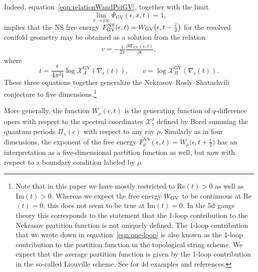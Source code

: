 \documentclass[pdftex]{sigma}
\numberwithin{equation}{section}
\begin{document}
Indeed, equation~\eqref{eqn:relationWandPsiGV}, together with the limit
\begin{equation*}
 \lim_{x\to \mathrm{i} \infty} \Psi_{\mathrm{GV}}(\epsilon,x,t) = 1,
\end{equation*}
implies that the NS free energy $F^{\rm NS}_\mathrm{GV}(\epsilon,t) = W_\mathrm{GV} \big(\epsilon, t- \frac{\check{\epsilon}}{2}\big)$ for the resolved conifold geometry may be obtained as a solution from the relation
\begin{gather}\label{eqn:5dNRSconifold}
v = - \frac{1}{2 \pi } \frac{\partial W_\mathrm{GV}(\epsilon,t)}{\partial t},
\end{gather}
where
\begin{equation*}%
t = \frac{\epsilon}{4 \pi^2 \mathrm{i}} \log \mathcal{X}^{\mathrm{GV}}_{A} (\nabla_\epsilon(t)),\qquad
v = \log \mathcal{X}^{\mathrm{GV}}_{B} (\nabla_\epsilon(t)).
\end{equation*}
These three equations together generalize the Nekrasov--Rosly--Shatashvili conjecture to five dimensions.\footnote{Note that in this paper we have mostly restricted to Re$(t)>0$ as well as Im$(t)>0$. Whereas we expect the free energy $W_{\rm GV}$ to be continuous at Re$(t)=0$, this does not seem to be true at Im$(t)=0$. In the 5d gauge theory this corresponds to the statement that the 1-loop contribution to the Nekrasov partition function is not uniquely defined. The 1-loop contribution that we wrote down in equation~\eqref{eqn:one-loop} is also known as the 1-loop contribution to the partition function in the topological string scheme. We expect that the average partition function is given by the 1-loop contribution in the so-called Liouville scheme. See \cite{Hollands:recipe} for 4d examples and references. }


More generally, the function $W_\rho(\epsilon,t)$ is the generating function of $q$-difference opers with respect to the spectral coordinates $\mathcal{X}^\rho_\gamma$ defined by Borel summing the quantum periods $\Pi_\gamma(\epsilon)$ with respect to any ray $\rho$.
Similarly as in four dimensions, the exponent of the free energy $F^{\mathrm{NS}}_\rho(\epsilon,t)= W_\rho \big(\epsilon, t+ \frac{\check{\epsilon}}{2}\big)$ has an interpretation as a five-dimensional partition function as well, but now with respect to a boundary condition labeled by $\rho$.
\end{document}
